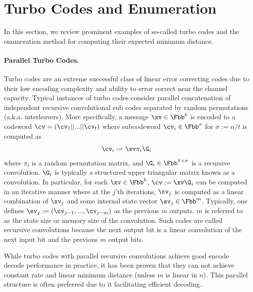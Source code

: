

\section{Turbo Codes and Enumeration}\label{sec:turbo}

In this section, we review prominent examples of so-called turbo codes and the enumeration method for computing their expected minimum distance.


\paragraph{Parallel Turbo Codes.} Turbo codes are an extreme successful class of linear error correcting codes \cite{turbo,vucetic2012turbo} due to their low encoding complexity and ability to error correct near the channel capacity. Typical instances of turbo codes consider parallel concatenation of independent recursive convolutional sub codes separated by random permutations (a.k.a. interleavers). More specifically, a message $\xv\in \Fbb^k$ is encoded to a codeword $\cv =(\cv_1 || ... || \cv_t)$ where subcodeword $\cv_i\in \Fbb^{\sigma}$ for $\sigma:=n/t$ is computed as
$$
\cv_i := \xv \pi_i \G_i
$$
where $\pi_i$ is a random permutation matrix, and $\G_i\in \Fbb^{k\times \sigma}$ is a recursive convolution. $\G_i$ is typically a structured upper triangular matrix known as a convolution. In particular, for each $\xv\in \Fbb^k$, $\cv:=\xv\G_i$ can be computed in an iterative manner where at the $j$'th iterations, $\cv_j$ is computed as a linear combination of $\xv_j$ and some internal state vector $\sv_j\in \Fbb^m$. Typically, one defines $\sv_j:=(\cv_{j-1},...,\cv_{j-m})$ as the previous $m$ outputs. $m$ is referred to as the state size or memory size of the convolution. Such codes are called recursive convolutions because the next output bit is a linear convolution of the next input bit and the previous $m$ output bits.

While turbo codes with parallel recursive convolutions achieve good encode decode performance in practice, it has been proven that they can not achieve constant rate and linear minimum distance (unless $m$ is linear in $n$)\cite{kahale1998minimum,spielman}. This parallel structure is often preferred due to it facilitating efficient decoding.

